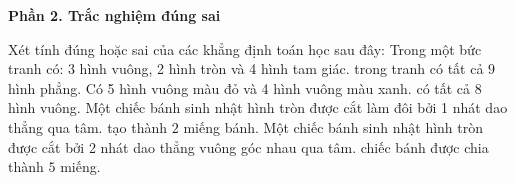 \textbf{Phần 2. Trắc nghiệm đúng sai}

\begin{ex} %
Xét tính đúng hoặc sai của các khẳng định toán học sau đây:
\choiceTF
{\True Trong một bức tranh có: 3 hình vuông, 2 hình tròn và 4 hình tam giác. trong tranh có tất cả $9$ hình phẳng.}
{Có 5 hình vuông màu đỏ và 4 hình vuông màu xanh. có tất cả $8$ hình vuông.}
{\True Một chiếc bánh sinh nhật hình tròn được cắt làm đôi bởi 1 nhát dao thẳng qua tâm. tạo thành $2$ miếng bánh.}
{Một chiếc bánh sinh nhật hình tròn được cắt bởi 2 nhát dao thẳng vuông góc nhau qua tâm. chiếc bánh được chia thành $5$ miếng.}
\end{ex}

